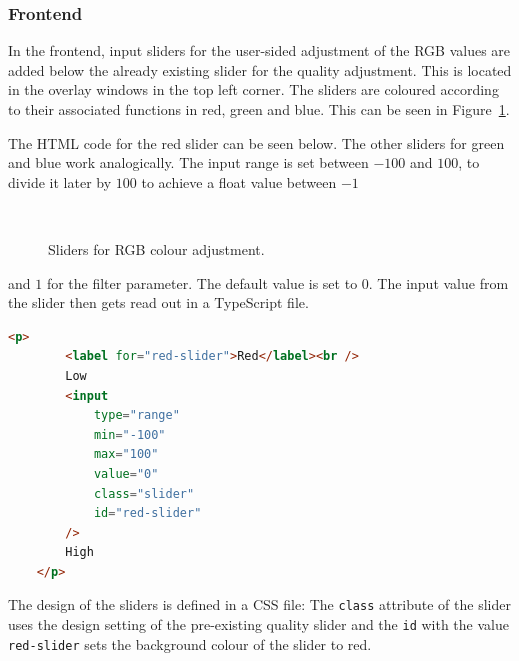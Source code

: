 \documentclass[../MasterThesis.tex]{subfiles}
\begin{document}
\subsubsection*{Frontend}
%
\vspace*{-0em}
\begin{minipage}{0.52\textwidth}
In the frontend, input sliders for the user-sided adjustment of the RGB values are added below the already existing slider for the quality adjustment. This is located in the overlay windows in the top left corner. The sliders are coloured according to their associated functions in red, green and blue. This can be seen in Figure~\ref{figure:sliders}.

The HTML code for the red slider can be seen below. The other sliders for green and blue work analogically. The input range is set between $-100$ and $100$, to divide it later by $100$ to achieve a float value between $-1$




\end{minipage}\begin{minipage}{0.04\textwidth}
\ 
\end{minipage}\begin{minipage}{0.44\textwidth}
\begin{figure}[H]
	\begin{center}
		\caption[Sliders for RGB colour adjustment.]{Sliders for RGB colour adjustment.}
		\label{figure:sliders}
	\end{center}
\end{figure}
\hfill
\end{minipage}

\vspace*{-1.1em}
and $1$ for the filter parameter. The default value is set to $0$. The input value from the slider then gets read out in a TypeScript file. 


\begin{lstlisting}[language=html, numbers=none]
	<p>
		<label for="red-slider">Red</label><br />
		Low
		<input
			type="range"
			min="-100"
			max="100"
			value="0"
			class="slider"
			id="red-slider"
		/>
		High
	</p>
\end{lstlisting}

The design of the sliders is defined in a CSS file: The \texttt{class} attribute of the slider uses the design setting of the pre-existing quality slider and the \texttt{id} with the value \texttt{red-slider} sets the background colour of the slider to red. 
\end{document}
